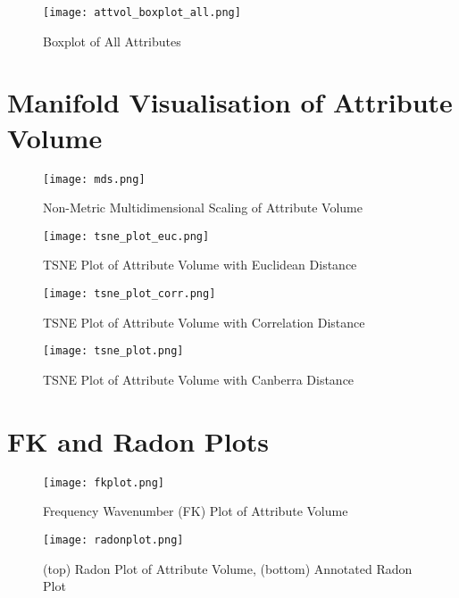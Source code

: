 \begin{figure}[!htp]
    \centering
    \texttt{[image: attvol\_boxplot\_all.png]}
    \caption{Boxplot of All Attributes}
    \label{fig:boxplot}
\end{figure}

\clearpage{}
\section{Manifold Visualisation of Attribute Volume}\label{manifoldplots}
\begin{figure}[H]
    \centering
    \texttt{[image: mds.png]}
    \caption{Non-Metric Multidimensional Scaling of Attribute Volume}
    \label{fig:MDS}
\end{figure}

\begin{figure}[H]
    \centering
    \texttt{[image: tsne\_plot\_euc.png]}
    \caption{TSNE Plot of Attribute Volume with Euclidean Distance}
    \label{fig:TSNE Euclid}
\end{figure}

\begin{figure}[H]
    \centering
    \texttt{[image: tsne\_plot\_corr.png]}
    \caption{TSNE Plot of Attribute Volume with Correlation Distance}
    \label{fig:TSNE}
\end{figure}

\begin{figure}[H]
    \centering
    \texttt{[image: tsne\_plot.png]}
    \caption{TSNE Plot of Attribute Volume with Canberra Distance}
    \label{fig:TSNE}
\end{figure}

\clearpage{}
\section{FK and Radon Plots}\label{seisplots}

\begin{figure}[!htp]
    \centering
    \texttt{[image: fkplot.png]}
    \caption{Frequency Wavenumber (FK) Plot of Attribute Volume}
    \label{fig: fkplot}
\end{figure}

\begin{figure}[!htp]
    \centering
    \texttt{[image: radonplot.png]}
    \caption{(top) Radon Plot of Attribute Volume, (bottom) Annotated Radon Plot}
    \label{fig: radonplot}
\end{figure}


